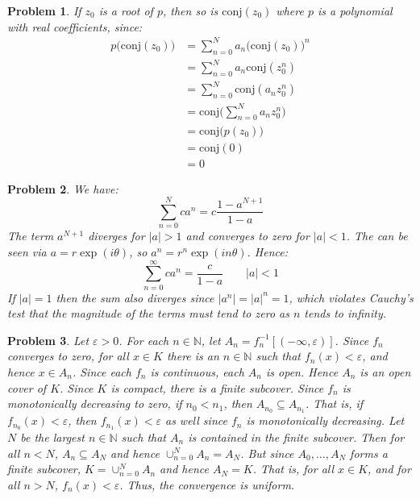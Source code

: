 \documentclass{article}
\theoremstyle{plain}
\theoremstyle{normal}
\newtheorem{problem}{Problem}[section]
\begin{document}
        \begin{problem}
            If $z_{0}$ is a root of $p$, then so is $\textrm{conj}(z_{0})$ where
            $p$ is a polynomial with \textit{real} coefficients, since:
            \begin{align}
                p\big(\textrm{conj}(z_{0})\big)
                &=\sum_{n=0}^{N}a_{n}\big(\textrm{conj}(z_{0})\big)^{n}\\
                &=\sum_{n=0}^{N}a_{n}\textrm{conj}(z_{0}^{n})\\
                &=\sum_{n=0}^{N}\textrm{conj}(a_{n}z_{0}^{n})\\
                &=\textrm{conj}\Big(\sum_{n=0}^{N}a_{n}z_{0}^{n}\Big)\\
                &=\textrm{conj}\big(p(z_{0})\big)\\
                &=\textrm{conj}(0)\\
                &=0
            \end{align}
        \end{problem}
        \begin{problem}
            We have:
            \begin{equation}
                \sum_{n=0}^{N}ca^{n}=c\frac{1-a^{N+1}}{1-a}
            \end{equation}
            The term $a^{N+1}$ diverges for $|a|>1$ and converges to zero for
            $|a|<1$. The can be seen via $a=r\exp(i\theta)$, so
            $a^{n}=r^{n}\exp(in\theta)$. Hence:
            \begin{equation}
                \sum_{n=0}^{\infty}ca^{n}=\frac{c}{1-a}\quad\quad|a|<1
            \end{equation}
            If $|a|=1$ then the sum also diverges since $|a^{n}|=|a|^{n}=1$,
            which violates Cauchy's test that the magnitude of the terms must
            tend to zero as $n$ tends to infinity.
        \end{problem}
        \begin{problem}
            Let $\varepsilon>0$. For each $n\in\mathbb{N}$, let
            $A_{n}=f_{n}^{-1}[(-\infty,\varepsilon)]$. Since
            $f_{n}$ converges to zero, for all $x\in{K}$ there is an
            $n\in\mathbb{N}$ such that $f_{n}(x)<\varepsilon$, and hence
            $x\in{A}_{n}$. Since each $f_{n}$ is continuous, each $A_{n}$ is
            open. Hence $A_{n}$ is an open cover of $K$. Since $K$ is compact,
            there is a finite subcover. Since $f_{n}$ is monotonically
            decreasing to zero, if $n_{0}<n_{1}$, then
            $A_{n_{0}}\subseteq{A}_{n_{1}}$. That is, if
            $f_{n_{0}}(x)<\varepsilon$, then $f_{n_{1}}(x)<\varepsilon$ as
            well since $f_{n}$ is monotonically decreasing. Let $N$ be the
            largest $n\in\mathbb{N}$ such that $A_{n}$ is contained in the
            finite subcover. Then for all $n<N$, $A_{n}\subseteq{A_{N}}$ and
            hence $\cup_{n=0}^{N}A_{n}=A_{N}$. But since $A_{0},\dots,A_{N}$
            forms a finite subcover, $K=\cup_{n=0}^{N}A_{n}$ and hence
            $A_{N}=K$. That is, for all $x\in{K}$, and for all $n>N$,
            $f_{n}(x)<\varepsilon$. Thus, the convergence is uniform.
        \end{problem}
\end{document}
